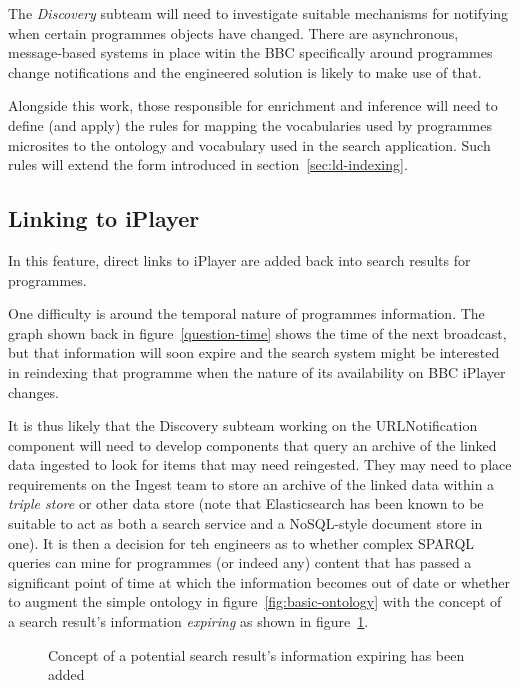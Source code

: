 The \emph{Discovery} subteam will need to investigate
suitable mechanisms for notifying when certain programmes
objects have changed. There are asynchronous, message-based
systems in place witin the BBC specifically around
programmes change notifications and the engineered solution
is likely to make use of that.

Alongside this work, those responsible for enrichment and
inference will need to define (and apply) the rules for
mapping the vocabularies used by programmes microsites
to the ontology and vocabulary used in the search application.
Such rules will extend the form introduced in
section~\ref{sec:ld-indexing}.

\subsection{Linking to iPlayer}

In this feature, direct links to iPlayer are added back into
search results for programmes.

One difficulty is around
the temporal nature of programmes information. The graph
shown back in figure~\ref{question-time} shows
the time of the next broadcast, but that information will
soon expire and the search system might be interested in
reindexing that programme when the nature of its availability
on BBC iPlayer changes.

It is thus likely that the Discovery subteam working on the
URLNotification component will need to develop components
that query an archive of the linked data ingested to look
for items that may need reingested. They may need to
place requirements on the Ingest team to store an archive
of the linked data within a \emph{triple store} or other
data store (note that Elasticsearch has been known to be
suitable to act as both a search service and a NoSQL-style
document store in one). It is then a decision for teh
engineers as to whether complex SPARQL queries can mine
for programmes (or indeed any) content that has passed
a significant point of time at which the information becomes
out of date or whether to augment the simple ontology
in figure~\ref{fig:basic-ontology} with the concept of
a search result's information \emph{expiring} as shown in
figure~\ref{fig:expiring-ontology}.

\begin{figure}
  \begin{center}
    \begin{dot2tex}[dot,pgf,scale=0.41]
      
    \end{dot2tex}
  \end{center}
  \caption{Concept of a potential search result's information expiring has been added}
  \label{fig:expiring-ontology}
\end{figure}

